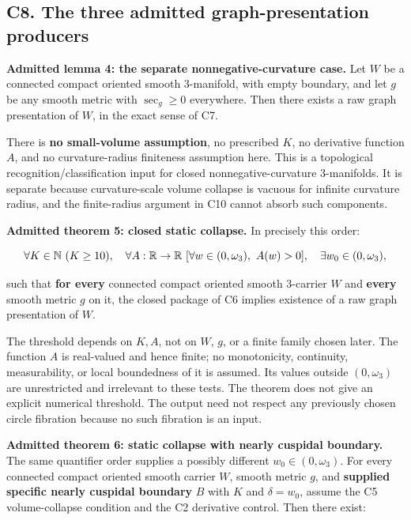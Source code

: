 \documentclass[
  letterpaper,
  11pt]{article}
\begin{document}
\subsection{C8. The three admitted graph-presentation
producers}\label{collapse-admitted}

\textbf{Admitted lemma 4: the separate nonnegative-curvature case.} Let
\(W\) be a connected compact oriented smooth 3-manifold, with empty
boundary, and let \(g\) be any smooth metric with \(\sec_g\geq0\)
everywhere. Then there exists a raw graph presentation of \(W\), in the
exact sense of C7.

There is \textbf{no small-volume assumption}, no prescribed \(K\), no
derivative function \(A\), and no curvature-radius finiteness assumption
here. This is a topological recognition/classification input for closed
nonnegative-curvature 3-manifolds. It is separate because
curvature-scale volume collapse is vacuous for infinite curvature
radius, and the finite-radius argument in C10 cannot absorb such
components.

\textbf{Admitted theorem 5: closed static collapse.} In precisely this
order:

\[
 \forall K\in\mathbb N\ (K\geq10),\quad
 \forall A:\mathbb R\to\mathbb R\ \relax
 [\forall w\in(0,\omega_3),\ A(w)>0],\quad
 \exists w_0\in(0,\omega_3),
\]

such that \textbf{for every} connected compact oriented smooth 3-carrier
\(W\) and \textbf{every} smooth metric \(g\) on it, the closed package
of C6 implies existence of a raw graph presentation of \(W\).

The threshold depends on \(K,A\), not on \(W\), \(g\), or a finite
family chosen later. The function \(A\) is real-valued and hence finite;
no monotonicity, continuity, measurability, or local boundedness of it
is assumed. Its values outside \((0,\omega_3)\) are unrestricted and
irrelevant to these tests. The theorem does not give an explicit
numerical threshold. The output need not respect any previously chosen
circle fibration because no such fibration is an input.

\textbf{Admitted theorem 6: static collapse with nearly cuspidal
boundary.} The same quantifier order supplies a possibly different
\(w_0\in(0,\omega_3)\). For every connected compact oriented smooth
carrier \(W\), smooth metric \(g\), and \textbf{supplied specific nearly
cuspidal boundary} \(B\) with \(K\) and \(\delta=w_0\), assume the C5
volume-collapse condition and the C2 derivative control. Then there
exist:
\end{document}
